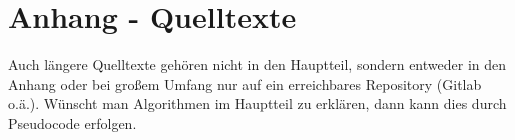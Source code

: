 
\clearpage
\chapter{Anhang - Quelltexte}
Auch längere Quelltexte gehören nicht in den Hauptteil,
sondern entweder in den Anhang oder bei großem Umfang nur auf
ein erreichbares Repository (Gitlab o.ä.).
Wünscht man Algorithmen im Hauptteil zu erklären, dann kann dies durch Pseudocode erfolgen.
